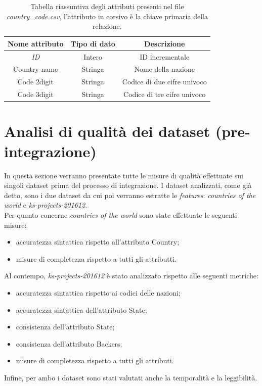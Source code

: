 \begin{table}
	\caption{Tabella riassuntiva degli attributi presenti nel file \textit{country\_code.csv}, l'attributo in corsivo è la chiave primaria della relazione.}
	
	\label{tab:code}
	
	\centering
	\begin{tabular}{|c|c|c|}
		\hline
		\textbf{Nome attributo} & \textbf{Tipo di dato} & \textbf{Descrizione} \\ 
		\hline  
		\rule{0pt}{13pt}\emph{ID} & Intero & ID incrementale \\ 
		\hline  
		\rule{0pt}{13pt}Country name & Stringa & Nome della nazione \\ 
		\hline  
		\rule{0pt}{13pt}Code 2digit & Stringa & Codice di due cifre univoco \\ 
		\hline  
		\rule{0pt}{13pt}Code 3digit & Stringa & Codice di tre cifre univoco \\ 
		\hline   
	\end{tabular}
\end{table} 
\newpage
\section{Analisi di qualità dei dataset (pre-integrazione)}
In questa sezione verranno presentate tutte le misure di qualità effettuate sui singoli dataset prima del processo di integrazione.
I dataset analizzati, come già detto, sono i due dataset da cui poi verranno estratte le \textit{features}: \textit{countries of the world} e \textit{ks-projects-201612}.\\
Per quanto concerne \textit{countries of the world} sono state effettuate le seguenti misure:
\begin{itemize}
	\item accuratezza sintattica rispetto all'attributo Country;
	\item misure di completezza rispetto a tutti gli attributti.
\end{itemize}
Al contempo, \textit{ks-projects-201612} è stato analizzato rispetto alle seguenti metriche:
\begin{itemize}
	\item accuratezza sintattica rispetto ai codici delle nazioni;
	\item accuratezza sintattica dell'attributo State;
	\item consistenza dell'attributo State;
	\item consistenza dell'attributo Backers;
	\item misure di completezza rispetto a tutti gli attributi.
\end{itemize}
Infine, per ambo i dataset sono stati valutati anche la temporalità e la leggibilità.


